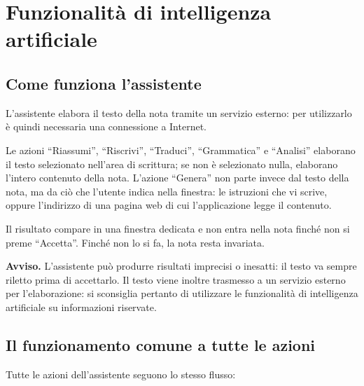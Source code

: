 \documentclass[a4paper, 10pt]{article}
\begin{document}
\section{Funzionalità di intelligenza artificiale}
\label{sec:funzionalita-intelligenza-artificiale}

\subsection{Come funziona l'assistente}
\label{sec:come-funziona-assistente}
L'assistente elabora il testo della nota tramite un servizio esterno: per utilizzarlo è quindi necessaria una connessione a Internet.

Le azioni ``Riassumi'', ``Riscrivi'', ``Traduci'', ``Grammatica'' e ``Analisi'' elaborano il testo selezionato nell'area di scrittura; se non è selezionato nulla, elaborano l'intero contenuto della nota. L'azione ``Genera'' non parte invece dal testo della nota, ma da ciò che l'utente indica nella finestra: le istruzioni che vi scrive, oppure l'indirizzo di una pagina web di cui l'applicazione legge il contenuto.

Il risultato compare in una finestra dedicata e non entra nella nota finché non si preme ``Accetta''. Finché non lo si fa, la nota resta invariata.

\vspace{0.5em}

\noindent
\textbf{Avviso.} L'assistente può produrre risultati imprecisi o inesatti: il testo va sempre riletto prima di accettarlo. Il testo viene inoltre trasmesso a un servizio esterno per l'elaborazione: si sconsiglia pertanto di utilizzare le funzionalità di intelligenza artificiale su informazioni riservate.

\subsection{Il funzionamento comune a tutte le azioni}
\label{sec:funzionamento-comune-azioni}
Tutte le azioni dell'assistente seguono lo stesso flusso:
\end{document}
